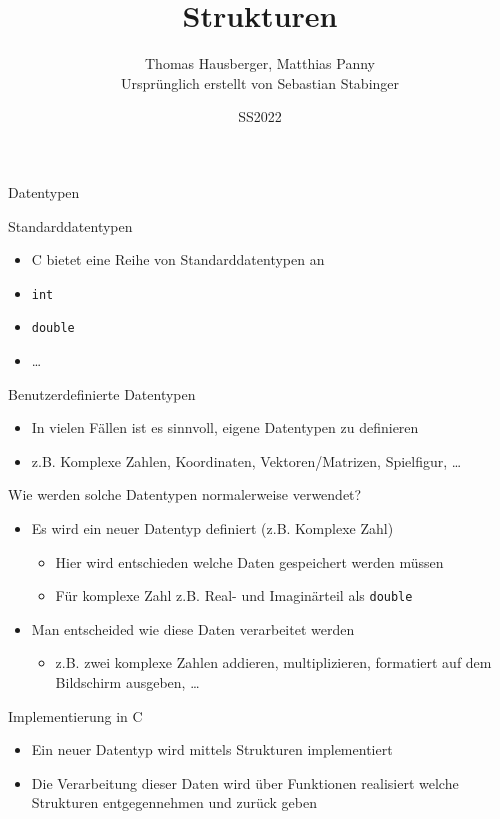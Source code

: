 \documentclass[presentation]{beamer}
\author{Thomas Hausberger, Matthias Panny \\ Ursprünglich erstellt von Sebastian Stabinger}
\date{SS2022}
\title{Strukturen}
\begin{document}
\maketitle

\begin{frame}[label={sec:org11643fd},fragile]{Datentypen}
 \begin{block}{Standarddatentypen}
\begin{itemize}
\item C bietet eine Reihe von Standarddatentypen an
\item {\color{solarizedYellow}\verb!int!}
\item {\color{solarizedYellow}\verb!double!}
\item \ldots{}
\end{itemize}
\end{block}
\begin{block}{Benutzerdefinierte Datentypen}
\begin{itemize}
\item In vielen Fällen ist es sinnvoll, \alert{eigene Datentypen} zu definieren
\item z.B. Komplexe Zahlen, Koordinaten, Vektoren/Matrizen, Spielfigur, \ldots{}
\end{itemize}
\end{block}
\end{frame}
\begin{frame}[label={sec:org6cb0e41},fragile]{Wie werden solche Datentypen normalerweise verwendet?}
 \begin{itemize}
\item Es wird ein \alert{neuer Datentyp} definiert (z.B. Komplexe Zahl)
\begin{itemize}
\item Hier wird entschieden welche Daten gespeichert werden müssen
\item Für komplexe Zahl z.B. \alert{Real- und Imaginärteil} als {\color{solarizedYellow}\verb!double!}
\end{itemize}
\item Man entscheided wie diese \alert{Daten verarbeitet} werden
\begin{itemize}
\item z.B. zwei komplexe Zahlen addieren, multiplizieren, formatiert
auf dem Bildschirm ausgeben, \ldots{}
\end{itemize}
\end{itemize}
\begin{block}{Implementierung in C}
\begin{itemize}
\item Ein \alert{neuer Datentyp} wird mittels \alert{Strukturen} implementiert
\item Die \alert{Verarbeitung} dieser Daten wird über \alert{Funktionen} realisiert
welche Strukturen entgegennehmen und zurück geben
\end{itemize}
\end{block}
\end{frame}
\end{document}
